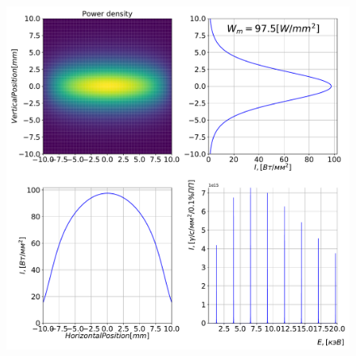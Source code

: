 \documentclass[14pt, hyperref = {colorlinks}]{beamer}
\begin{document}
\begin{frame}
\begin{figure}[h]
\begin{minipage}[h]{0.49\linewidth}
	\raggedright{\includegraphics[width=1.1\linewidth]{pic/power_dens.pdf}}
	\end{minipage}
\end{figure}

\end{frame}

\end{document}
